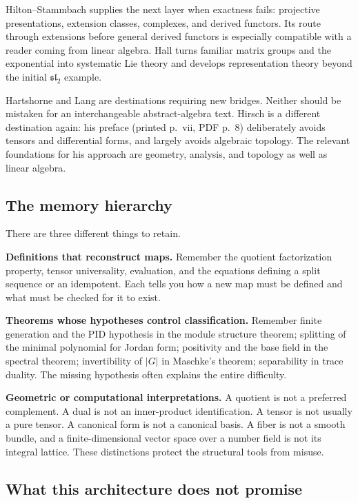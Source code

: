 \documentclass[
  11pt,
]{article}
\begin{document}
Hilton--Stammbach supplies the next layer when exactness fails:
projective presentations, extension classes, complexes, and derived
functors. Its route through extensions before general derived functors
is especially compatible with a reader coming from linear algebra. Hall
turns familiar matrix groups and the exponential into systematic Lie
theory and develops representation theory beyond the initial
\(\mathfrak{sl}_2\) example.

Hartshorne and Lang are destinations requiring new bridges. Neither
should be mistaken for an interchangeable abstract-algebra text. Hirsch
is a different destination again: his preface (printed p.~vii, PDF p.~8)
deliberately avoids tensors and differential forms, and largely avoids
algebraic topology. The relevant foundations for his approach are
geometry, analysis, and topology as well as linear algebra.

\subsection*{The memory hierarchy}\label{the-memory-hierarchy}

There are three different things to retain.

\textbf{Definitions that reconstruct maps.} Remember the quotient
factorization property, tensor universality, evaluation, and the
equations defining a split sequence or an idempotent. Each tells you how
a new map must be defined and what must be checked for it to exist.

\textbf{Theorems whose hypotheses control classification.} Remember
finite generation and the PID hypothesis in the module structure
theorem; splitting of the minimal polynomial for Jordan form; positivity
and the base field in the spectral theorem; invertibility of \(|G|\) in
Maschke's theorem; separability in trace duality. The missing hypothesis
often explains the entire difficulty.

\textbf{Geometric or computational interpretations.} A quotient is not a
preferred complement. A dual is not an inner-product identification. A
tensor is not usually a pure tensor. A canonical form is not a canonical
basis. A fiber is not a smooth bundle, and a finite-dimensional vector
space over a number field is not its integral lattice. These
distinctions protect the structural tools from misuse.

\subsection*{What this architecture does not
promise}\label{what-this-architecture-does-not-promise}
\end{document}

